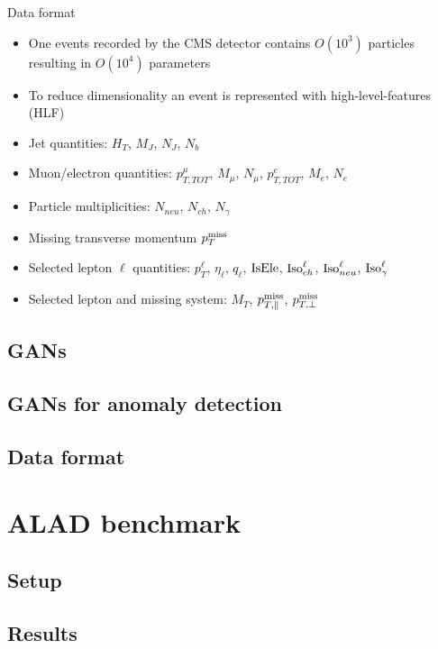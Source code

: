 \documentclass{beamer}
\begin{document}
\begin{frame}{Data format}
  \begin{itemize}
      \item<1-> One events recorded by the CMS detector contains $O(10^3)$ particles resulting in $O(10^4)$ parameters
      \item<2-> To reduce dimensionality an event is represented with high-level-features (HLF)
      \item<3-> Jet quantities: $H_T$, $M_J$, $N_J$, $N_b$
      \item<4-> Muon/electron quantities: $p_{T,TOT}^\mu$, $M_\mu$, $N_\mu$, $p_{T,TOT}^e$, $M_e$, $N_e$
      \item<5-> Particle multiplicities: $N_{neu}$, $N_{ch}$, $N_\gamma$
      \item<6-> Missing transverse momentum $p_T^\textup{miss}$
      \item<7-> Selected lepton $\ell$ quantities: $p_T^\ell$, $\eta_\ell$, $q_\ell$, $\textup{IsEle}$, $\textup{Iso}_{ch}^\ell$, $\textup{Iso}_{neu}^\ell$, $\textup{Iso}_{\gamma}^\ell$
      \item Selected lepton and missing system: $M_T$, $p_{T,\parallel}^\textup{miss}$, $p_{T,\perp}^\textup{miss}$
  \end{itemize}
\end{frame}

\subsection{GANs}

\subsection{GANs for anomaly detection}
\subsection{Data format}

\section{ALAD benchmark}
\subsection{Setup}
\subsection{Results}
\end{document}
